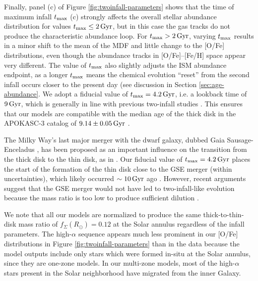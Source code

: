 \documentclass[twocolumn,twocolappendix,linenumbers]{aastex631}
\newcommand{\Gyr}{\,{\rm Gyr}}
\begin{document}
Finally, panel (c) of Figure \ref{fig:twoinfall-parameters} shows that the time of maximum infall $t_{\rm max}$ (c) strongly affects the overall stellar abundance distribution for values $t_{\rm max}\leq2\Gyr$, but in this case the gas tracks do not produce the characteristic abundance loop. For $t_{\rm max}>2\Gyr$, varying $t_{\rm max}$ results in a minor shift to the mean of the MDF and little change to the [O/Fe] distributions, even though the abundance tracks in [O/Fe]--[Fe/H] space appear very different. The value of $t_{\rm max}$ also slightly adjusts the ISM abundance endpoint, as a longer $t_{\rm max}$ means the chemical evolution ``reset'' from the second infall occurs closer to the present day (see discussion in Section \ref{sec:age-abundance}. We adopt a fiducial value of $t_{\rm max}=4.2\Gyr$, i.e. a lookback time of $9\Gyr$, which is generally in line with previous two-infall studies \citep[e.g.,][]{nissen_high-precision_2020,spitoni_galactic_2020,spitoni_apogee_2021}. This ensures that our models are compatible with the median age of the thick disk in the APOKASC-3 catalog of $9.14\pm0.05\Gyr$ \citep{pinsonneault_apokasc-3_2025}. 

The Milky Way's last major merger with the dwarf galaxy, dubbed Gaia Sausage-Enceladus \citep[GSE;][]{belokurov_co-formation_2018,helmi_merger_2018}, has been proposed as an important influence on the transition from the thick disk to the thin disk, as in \citet{spitoni_remind_2024}. Our fiducial value of $t_{\rm max}=4.2\Gyr$ places the start of the formation of the thin disk close to the GSE merger (within uncertainties), which likely occurred $\sim10\Gyr$ ago \citep[e.g.,][]{helmi_merger_2018,gallart_uncovering_2019,naidu_reconstructing_2021,woody_rapid_2025}. However, recent arguments suggest that the GSE merger would not have led to two-infall-like evolution because the mass ratio is too low to produce sufficient dilution \citet{orkney_milky_2025}.

We note that all our models are normalized to produce the same thick-to-thin-disk mass ratio of $f_{\Sigma}(R_\odot)=0.12$ \citep{bland-hawthorn_galaxy_2016} at the Solar annulus regardless of the infall parameters. The high-$\alpha$ sequence appears much less prominent in our [O/Fe] distributions in Figure \ref{fig:twoinfall-parameters} than in the data because the model outputs include only stars which were formed in-situ at the Solar annulus, since they are one-zone models. In our multi-zone models, most of the high-$\alpha$ stars present in the Solar neighborhood have migrated from the inner Galaxy.
\end{document}
